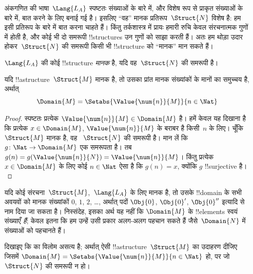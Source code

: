 \documentclass[../../../include/open-logic-section]{subfiles}
\begin{document}

अंकगणित की भाषा~$\Lang{L_A}$ स्पष्टतः संख्याओं के बारे में, और विशेष रूप से
प्राकृत संख्याओं के बारे में, बात करने के लिए बनाई गई है। इसलिए “वह” मानक
प्रतिरूप~$\Struct{N}$ विशेष है: हम इसी प्रतिरूप के बारे में बात करना चाहते
हैं। किंतु तर्कशास्त्र में प्रायः हमारी रुचि केवल संरचनात्मक गुणों में होती है,
और कोई भी दो समरूपी !!{structure}s उन गुणों को साझा करती हैं। अतः हम थोड़ा
उदार होकर~$\Struct{N}$ की समरूपी किसी भी !!{structure} को “मानक” मान सकते
हैं।

\begin{defn}
$\Lang{L_A}$ की कोई !!{structure} \emph{मानक} है, यदि वह~$\Struct{N}$ की
समरूपी है।
\end{defn}

\begin{prop}
 यदि !!a{structure}~$\Struct{M}$ मानक है, तो
उसका प्रांत मानक संख्यांकों के मानों का समुच्चय है, अर्थात्
\[
\Domain{M} = \Setabs{\Value{\num{n}}{M}}{n \in \Nat}
\]
\end{prop}

\begin{proof}
स्पष्टतः प्रत्येक $\Value{\num{n}}{M} \in \Domain{M}$ है। हमें केवल यह
दिखाना है कि प्रत्येक $x \in \Domain{M}$, $\Value{\num{n}}{M}$ के बराबर है
किसी~$n$ के लिए। चूँकि $\Struct{M}$ मानक है, वह
~$\Struct{N}$ की समरूपी है। मान लें कि $g\colon \Nat \to \Domain{M}$
एक समरूपता है। तब $g(n) = g(\Value{\num{n}}{N}) =
\Value{\num{n}}{M}$। किंतु प्रत्येक $x \in \Domain{M}$ के लिए कोई
$n
\in \Nat$ ऐसा है कि $g(n) = x$, क्योंकि $g$ !!{surjective} है।
\end{proof}

\begin{explain}
यदि कोई संरचना~$\Struct{M}$,~$\Lang{L_A}$ के लिए मानक है, तो उसके
!!{domain} के
सभी अवयवों को मानक संख्यांकों $\num{0}$, $\num{1}$, $\num{2}$, \dots,
अर्थात् पदों $\Obj{0}$, $\Obj{0}'$, $\Obj{0}''$ इत्यादि से नाम दिया जा
सकता है। निस्संदेह, इसका अर्थ यह नहीं कि $\Domain{M}$ के !!{element}s स्वयं
संख्याएँ \emph{हैं}; केवल इतना कि हम उन्हें उसी प्रकार अलग-अलग पहचान सकते
हैं जैसे~$\Domain{N}$ में संख्याओं को पहचानते हैं।
\end{explain}

\begin{prob}
दिखाइए कि  का विलोम असत्य है;
अर्थात् ऐसी !!a{structure}~$\Struct{M}$ का उदाहरण दीजिए जिसमें
$\Domain{M} = \Setabs{\Value{\num{n}}{M}}{n \in \Nat}$ हो, पर जो
~$\Struct{N}$ की समरूपी न हो।
\end{prob}
\end{document}
